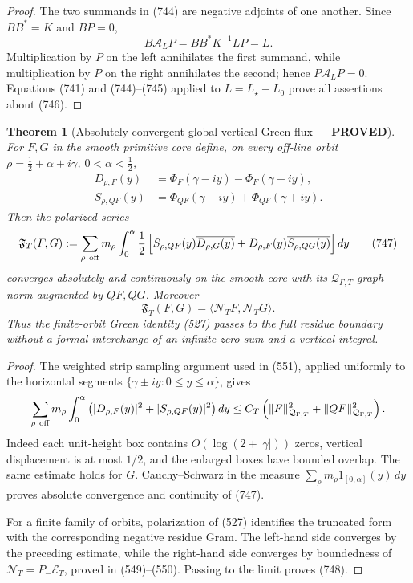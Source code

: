 \documentclass[11pt]{article}
\newtheorem{theorem}{Theorem}
\newcommand{\PROVED}{\textcolor{green!45!black}{\textbf{PROVED}}}
\begin{document}
\begin{proof}
The two summands in (744) are negative adjoints of one another.  Since
\(BB^*=K\) and \(BP=0\),
\[
 B\mathcal A_LP=BB^*K^{-1}LP=L.
\]
Multiplication by \(P\) on the left annihilates the first summand, while
multiplication by \(P\) on the right annihilates the second; hence
\(P\mathcal A_LP=0\).  Equations (741) and (744)--(745) applied to
\(L=L_\star-L_0\) prove all assertions about (746).
\end{proof}

\begin{theorem}[Absolutely convergent global vertical Green flux ---
\PROVED]
For \(F,G\) in the smooth primitive core define, on every off-line orbit
\(\rho=\frac12+\alpha+i\gamma\), \(0<\alpha<\frac12\),
\begin{align*}
 D_{\rho,F}(y)&=\Phi_F(\gamma-iy)-\Phi_F(\gamma+iy),\\
 S_{\rho,QF}(y)&=\Phi_{QF}(\gamma-iy)+\Phi_{QF}(\gamma+iy).
\end{align*}
Then the polarized series
\begin{equation}
 \mathfrak F_T(F,G):=
 \sum_{\rho\ {\rm off}}m_\rho\int_0^\alpha
 \frac12\left[
 S_{\rho,QF}(y)\overline{D_{\rho,G}(y)}
 +D_{\rho,F}(y)\overline{S_{\rho,QG}(y)}
 \right]dy                                          \tag{747}
\end{equation}
converges absolutely and continuously on the smooth core with its
\(\mathcal Q_{\Gamma,T}\)-graph norm augmented by \(QF,QG\).  Moreover
\begin{equation}
 \boxed{
 \mathfrak F_T(F,G)
 =\langle\mathcal N_TF,\mathcal N_TG\rangle.}        \tag{748}
\end{equation}
Thus the finite-orbit Green identity (527) passes to the full residue
boundary without a formal interchange of an infinite zero sum and a
vertical integral.
\end{theorem}

\begin{proof}
The weighted strip sampling argument used in (551), applied uniformly to
the horizontal segments
\(\{\gamma\pm iy:0\le y\le\alpha\}\), gives
\[
 \sum_{\rho\ {\rm off}}m_\rho\int_0^\alpha
 \left(|D_{\rho,F}(y)|^2+|S_{\rho,QF}(y)|^2\right)dy
 \le C_T\left(
 \|F\|_{\mathcal Q_{\Gamma,T}}^2+
 \|QF\|_{\mathcal Q_{\Gamma,T}}^2\right).
\]
Indeed each unit-height box contains \(O(\log(2+|\gamma|))\) zeros,
vertical displacement is at most \(1/2\), and the enlarged boxes have
bounded overlap.  The same estimate holds for \(G\).  Cauchy--Schwarz in
the measure
\(\sum_\rho m_\rho1_{[0,\alpha]}(y)\,dy\) proves absolute convergence and
continuity of (747).

For a finite family of orbits, polarization of (527) identifies the
truncated form with the corresponding negative residue Gram.  The
left-hand side converges by the preceding estimate, while the right-hand
side converges by boundedness of
\(\mathcal N_T=P_-\mathcal E_T\), proved in (549)--(550).  Passing to the
limit proves (748).
\end{proof}
\end{document}
